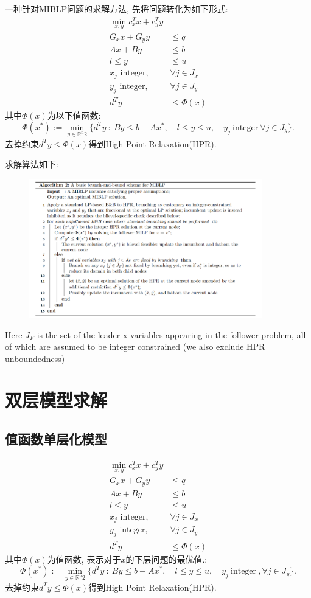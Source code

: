 \documentclass{article}
\begin{document}
一种针对MIBLP问题的求解方法, 先将问题转化为如下形式:
\begin{align*}
    \operatorname*{min}_{x,y}c_{x}^{T}x+c_{y}^{T}y \\
    G_{x}x+G_{y}y& \leq q  \\
    Ax+By&\leq b \\
    l\leq y& \leq u  \\
    x_j\text{ integer},&\forall j\in J_x\\
    y_{j}\text{ integer},&\forall j\in J_{y} \\
    d^{T}y&\leq\Phi(x)
\end{align*}
其中$\Phi(x)$为以下值函数:
$$
\Phi(x^*):=\min_{y\in\mathbb{R}^n2}\{d^Ty~:~By\leq b-Ax^*,\quad l\leq y\leq u,\quad y_j\mathrm{~integer~}\forall j\in J_y\}.
$$
去掉约束$d^Ty\leq\Phi(x)$得到High Point Relaxation(HPR).

求解算法如下:
\begin{figure}[H]
    \centering
    \includegraphics[width=0.9\textwidth]{./pic/MIBLP_algo.png}
    \label{fig:MIBLP}
\end{figure}
Here $J_F$ is the set of the leader x-variables appearing in the follower problem, all of 
which are assumed to be integer constrained (we also exclude HPR unboundedness)

\clearpage

\section{双层模型求解}
\subsection{值函数单层化模型}
\begin{align*}
    \operatorname*{min}_{x,y}c_{x}^{T}x+c_{y}^{T}y \\
    G_{x}x+G_{y}y& \leq q  \\
    Ax+By&\leq b \\
    l\leq y& \leq u  \\
    x_j\text{ integer},&\forall j\in J_x\\
    y_{j}\text{ integer},&\forall j\in J_{y} \\
    d^{T}y&\leq\Phi(x)
\end{align*}
其中$\Phi(x)$为值函数, 表示对于$x$的下层问题的最优值.:
$$
\Phi(x^*):=\min_{y\in\mathbb{R}^n2}\{d^Ty~:~By\leq b-Ax^*,\quad l\leq y\leq u,\quad y_j\mathrm{~integer~},\forall j\in J_y\}.
$$
去掉约束$d^Ty\leq\Phi(x)$得到High Point Relaxation(HPR).
\end{document}
